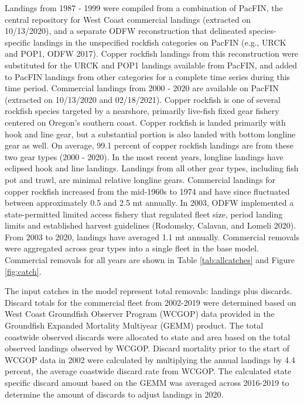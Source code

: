 \documentclass[11pt,
  english,
  a4paper,
]{article}
\begin{document}
Landings from 1987 - 1999 were compiled from a combination of PacFIN, the central repository for West Coast commercial landings (extracted on 10/13/2020), and a separate ODFW reconstruction that delineated species-specific landings in the unspecified rockfish categories on PacFIN (e.g., URCK and POP1, ODFW 2017). Copper rockfish landings from this reconstruction were substituted for the URCK and POP1 landings available from PacFIN, and added to PacFIN landings from other categories for a complete time series during this time period. Commercial landings from 2000 - 2020 are available on PacFIN (extracted on 10/13/2020 and 02/18/2021). Copper rockfish is one of several rockfish species targeted by a nearshore, primarily live-fish fixed gear fishery centered on Oregon's southern coast. Copper rockfish is landed primarily with hook and line gear, but a substantial portion is also landed with bottom longline gear as well. On average, 99.1 percent of copper rockfish landings are from these two gear types (2000 - 2020). In the most recent years, longline landings have eclipsed hook and line landings. Landings from all other gear types, including fish pot and trawl, are minimal relative longline gears. Commercial landings for copper rockfish increased from the mid-1960s to 1974 and have since fluctuated between approximately 0.5 and 2.5 mt annually. In 2003, ODFW implemented a state-permitted limited access fishery that regulated fleet size, period landing limits and established harvest guidelines {(Rodomsky, Calavan, and Lomeli 2020)\leavevmode\tagmcend\tagstructend}. From 2003 to 2020, landings have averaged 1.1 mt annually. Commercial removals were aggregated across gear types into a single fleet in the base model. Commercial removals for all years are shown in Table \ref{tab:allcatches} and Figure \ref{fig:catch}.

\leavevmode\tagmcend\tagstructend\par


The input catches in the model represent total removals: landings plus discards. Discard totals for the commercial fleet from 2002-2019 were determined based on West Coast Groundfish Observer Program (WCGOP) data provided in the Groundfish Expanded Mortality Multiyear (GEMM) product. The total coastwide observed discards were allocated to state and area based on the total observed landings observed by WCGOP. Discard mortality prior to the start of WCGOP data in 2002 were calculated by multiplying the annual landings by 4.4 percent, the average coastwide discard rate from WCGOP. The calculated state specific discard amount based on the GEMM was averaged across 2016-2019 to determine the amount of discards to adjust landings in 2020.
\end{document}
